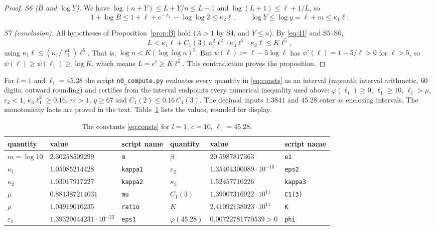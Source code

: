 \documentclass[10pt]{article}
\makeatletter
\numberwithin{equation}{section}
\theoremstyle{definition}
\theoremstyle{plain}
\renewcommand\subsection{\@startsection{subsection}{2}{\z@}{-2.2ex \@plus -.6ex \@minus -.2ex}{1ex \@plus .2ex}{\normalfont\normalsize\bfseries}}
\newcommand{\Bbar}{\overline{B}}
\newcommand{\eps}{\varepsilon}
\makeatother
\begin{document}
\begin{proof}
\emph{S6 ($\Bbar$ and $\log Y$).} We have $\log(n+Y)\le L+Y/n\le L+1$ and $\log(L+1)\le\ell+1/L$, so
\[
1+\log\Bbar\le1+\ell+e^{-\ell_1}-\log\log2\le\kappa_2\ell,\qquad \log Y\le\log y=\ell+m\le\kappa_1\ell.
\]

\emph{S7 (conclusion).} All hypotheses of Proposition~\ref{prop:B} hold ($A>1$ by S4, and $Y\le n$). By
\eqref{eq:41} and S5--S6,
\[
L<\kappa_1\ell+C_1(3)\,\kappa_1^2\ell^2\cdot\kappa_3\ell^2\cdot\kappa_2\ell\le K\ell^5,
\]
using $\kappa_1\ell\le(\kappa_1/\ell_1^4)\ell^5$. That is, $\log n<K(\log\log n)^5$. But
$\psi(\ell):=\ell-5\log\ell$ has $\psi'(\ell)=1-5/\ell>0$ for $\ell>5$, so $\psi(\ell)\ge\psi(\ell_1)\ge\log K$,
which means $L=e^\ell\ge K\ell^5$. This contradiction proves the proposition.
\end{proof}

\subsection{Proof of Theorem A}
For $l=1$ and $\ell_1=45.28$ the script \texttt{n0\_compute.py} evaluates every quantity in \eqref{eq:consts} as
an interval (mpmath interval arithmetic, 60 digits, outward rounding) and certifies from the interval endpoints
every numerical inequality used above: $\varphi(\ell_1)\ge0$, $\ell_1\ge10$, $\ell_1>\mu$, $\eps_2<1$,
$\kappa_3\ell_1^2\ge0.16$, $m>1$, $y\ge67$ and $C_1(2)\le0.16\,C_1(3)$. The decimal inputs $1.3841$ and $45.28$
enter as enclosing intervals. The monotonicity facts are proved in the text. Table~\ref{tab:consts} lists the
values, rounded for display.

\begin{table}[ht]
\centering
\small
\begin{tabular}{@{}lll@{\qquad}lll@{}}
\toprule
quantity & value & script name & quantity & value & script name\\
\midrule
$m=\log10$ & $2.30258509299$ & \texttt{m} & $\beta$ & $20.5987817363$ & \texttt{e1}\\
$\kappa_1$ & $1.05085214428$ & \texttt{kappa1} & $\eps_2$ & $1.35404300089\cdot10^{-16}$ & \texttt{eps2}\\
$\kappa_2$ & $1.03017917227$ & \texttt{kappa2} & $\kappa_3$ & $1.52457710226$ & \texttt{kappa3}\\
$\mu$ & $0.881387214031$ & \texttt{mu} & $C_1(3)$ & $1.39007316922\cdot10^{11}$ & \texttt{C1(3)}\\
$\rho$ & $1.04919010235$ & \texttt{ratio} & $K$ & $2.41092138023\cdot10^{11}$ & \texttt{K}\\
$\eps_1$ & $1.39329644231\cdot10^{-22}$ & \texttt{eps1} & $\varphi(45.28)$ & $0.00722781770539>0$ & \texttt{phi}\\
\bottomrule
\end{tabular}
\caption{The constants \eqref{eq:consts} for $l=1$, $c=10$, $\ell_1=45.28$.}\label{tab:consts}
\end{table}
\end{document}

